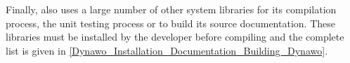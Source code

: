 \documentclass[a4paper, 12pt]{report}
\begin{document}
Finally, \Dynawo also uses a large number of other system libraries for its compilation process, the unit testing process or to build its source documentation. These libraries must be installed by the developer before compiling \Dynawo and the complete list is given in \ref{Dynawo_Installation_Documentation_Building_Dynawo}.



\end{document}
